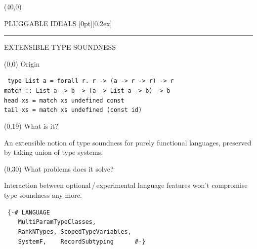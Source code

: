 \documentclass[a0]{a0poster}
\def\FONTSIZE#1{\fontsize{#1}{#1}\selectfont}
\def\HEAD#1{{\FONTSIZE{72}#1}}
\newenvironment{CODE}{\tt\FONTSIZE{36}\null}{}
\begin{document}
\raggedright
\FONTSIZE{45}

\begin{textblock}{71}(40,0)
{\FONTSIZE{207}%
PLUGGABLE IDEALS%
\raisebox{0pt}[0pt][0.2ex]{}
\hrule
\FONTSIZE{135}%
EXTENSIBLE TYPE SOUNDNESS\break\null
}
\end{textblock}

\begin{textblock}{37}(0,0)%
\HEAD{Origin}


\begin{CODE}
type List a = forall r.~r -> (a -> r -> r) -> r\\
match ::~List a -> b -> (a -> List a -> b) -> b\\
head xs = match xs undefined const\\
tail xs = match xs undefined (const id)\\
\end{CODE}
\end{textblock}

\begin{textblock}{30}(0,19)
\HEAD{What is it?}

An extensible notion of type soundness for purely functional
languages, preserved by taking union of type systems.
\end{textblock}

\begin{textblock}{30}(0,30)
\HEAD{What problems does it solve?}

Interaction between optional\,/\,experimental language features
won't compromise type soundness any more.

\begin{CODE}
\def\INDENT{~~~~}
\{-\# LANGUAGE\\
\INDENT MultiParamTypeClasses,\\
\INDENT RankNTypes, ScopedTypeVariables,\\
\INDENT SystemF,~~~~RecordSubtyping~~~~~~\#-\}\\
\end{CODE}
\end{textblock}
\end{document}
